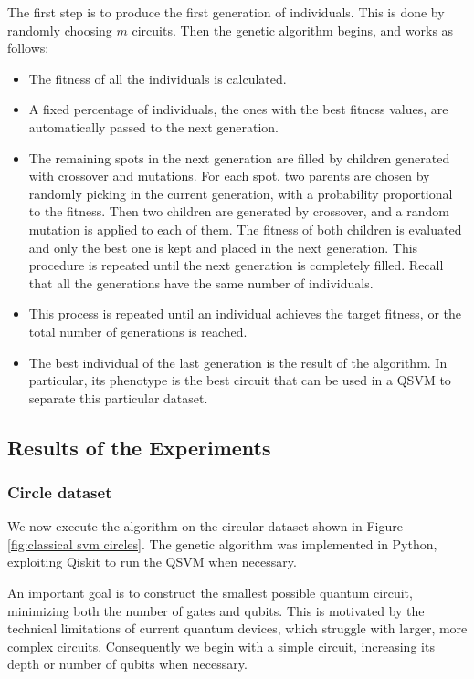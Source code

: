 \documentclass[12pt]{article}
\begin{document}
The first step is to produce the first generation of individuals. This is done by randomly choosing $m$ circuits. Then the genetic algorithm begins, and works as follows:
\begin{itemize}
    \item The fitness of all the individuals is calculated.
    \item A fixed percentage of individuals, the ones with the best fitness values, are automatically passed to the next generation. 
    \item The remaining spots in the next generation are filled by children generated with crossover and mutations. For each spot, two parents are chosen by randomly picking in the current generation, with a probability proportional to the fitness. Then two children are generated by crossover, and a random mutation is applied to each of them. The fitness of both children is evaluated and only the best one is kept and placed in the next generation. This procedure is repeated until the next generation is completely filled. Recall that all the generations have the same number of individuals.
    \item This process is repeated until an individual achieves the target fitness, or the total number of generations is reached.
    \item The best individual of the last generation is the result of the algorithm. In particular, its phenotype is the best circuit that can be used in a QSVM to separate this particular dataset. 
\end{itemize}


\subsection{Results of the Experiments}

\subsubsection{Circle dataset}
We now execute the algorithm on the circular dataset shown in Figure \ref{fig:classical svm circles}. The genetic algorithm was implemented in Python, exploiting Qiskit to run the QSVM when necessary.

An important goal is to construct the smallest possible quantum circuit, minimizing both the number of gates and qubits. This is motivated by the technical limitations of current quantum devices, which struggle with larger, more complex circuits. Consequently we begin with a simple circuit, increasing its depth or number of qubits when necessary.
\end{document}
